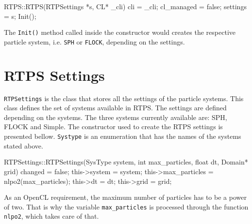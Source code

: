 
\begin{cppcode}{0}
RTPS::RTPS(RTPSettings *s, CL* _cli) 
{
	cli = _cli;
 	cl_managed = false;
	settings = s;
	Init();
}
\end{cppcode}

The \texttt{Init()} method called inside the constructor would creates the respective particle system, i.e. \texttt{SPH} or \texttt{FLOCK}, depending on the settings.

\section{RTPS Settings}\label{rtpsettings}
\texttt{RTPSettings} is the class that stores all the settings of the particle systems. This class defines the set of systems available in RTPS. The settings are defined depending on the systems. The three systems currently available are: SPH, FLOCK and Simple. The constructor used to create the RTPS  settings is presented bellow. \texttt{Systype} is an enumeration that has the names of the systems stated above.


\begin{cppcode}{0}
RTPSettings::RTPSettings(SysType system, int max_particles, float dt, Domain* grid)
{
	changed = false;
	this->system = system;
	this->max_particles = nlpo2(max_particles);
	this->dt = dt;
	this->grid = grid;
}
\end{cppcode}


As an OpenCL requirement, the maximum number of particles has to be a power of two. That is why the variable \texttt{max\_particles} is processed through the function \texttt{nlpo2}, which takes care of that.

